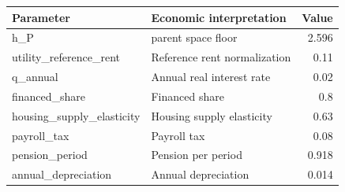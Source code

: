 \begingroup\small
\setlength{\tabcolsep}{3pt}
\renewcommand{\arraystretch}{1.04}
\begin{tabularx}{\linewidth}{XXr}
\toprule
Parameter & Economic interpretation & Value \\
\midrule
h\allowbreak\_P & parent space floor & 2.596 \\
utility\allowbreak\_reference\allowbreak\_rent & Reference rent normalization & 0.11 \\
q\allowbreak\_annual & Annual real interest rate & 0.02 \\
financed\allowbreak\_share & Financed share & 0.8 \\
housing\allowbreak\_supply\allowbreak\_elasticity & Housing supply elasticity & 0.63 \\
payroll\allowbreak\_tax & Payroll tax & 0.08 \\
pension\allowbreak\_period & Pension per period & 0.918 \\
annual\allowbreak\_depreciation & Annual depreciation & 0.014 \\
\bottomrule
\end{tabularx}
\endgroup
